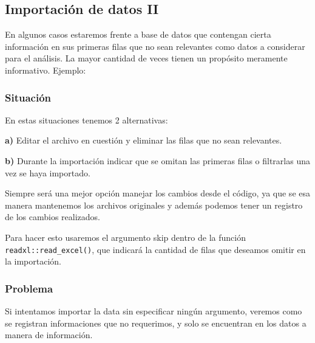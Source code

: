 \documentclass[
]{book}
\begin{document}
\hypertarget{importaciuxf3n-de-datos-ii}{%
\subsection{Importación de datos II}\label{importaciuxf3n-de-datos-ii}}

En algunos casos estaremos frente a base de datos que contengan cierta información en sus primeras filas que no sean relevantes como datos a considerar para el análisis. La mayor cantidad de veces tienen un propósito meramente informativo. Ejemplo:

\hypertarget{situaciuxf3n}{%
\subsubsection{Situación}\label{situaciuxf3n}}

En estas situaciones tenemos 2 alternativas:

\textbf{a)} Editar el archivo en cuestión y eliminar las filas que no sean relevantes.

\textbf{b)} Durante la importación indicar que se omitan las primeras filas o filtrarlas una vez se haya importado.

Siempre será una mejor opción manejar los cambios desde el código, ya que se esa manera mantenemos los archivos originales y además podemos tener un registro de los cambios realizados.

Para hacer esto usaremos el argumento skip dentro de la función \texttt{readxl::read\_excel()}, que indicará la cantidad de filas que deseamos omitir en la importación.

\hypertarget{problema}{%
\subsubsection{Problema}\label{problema}}

Si intentamos importar la data sin especificar ningún argumento, veremos como se registran informaciones que no requerimos, y solo se encuentran en los datos a manera de información.
\end{document}

